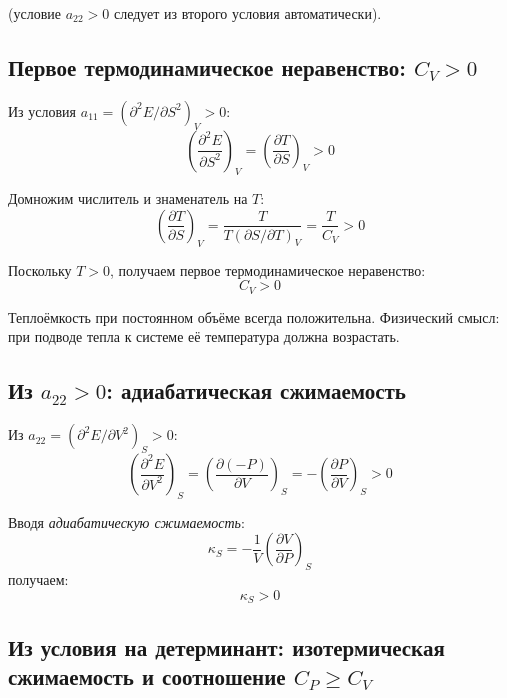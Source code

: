 \documentclass[../general/general]{subfiles}
\begin{document}
(условие $a_{22} > 0$ следует из второго условия автоматически).

\subsection{Первое термодинамическое неравенство: $C_V > 0$}

Из условия $a_{11} = \left(\partial^2 E/\partial S^2\right)_V > 0$:
\begin{equation}
    \left(\frac{\partial^2 E}{\partial S^2}\right)_{\!V} = \left(\frac{\partial T}{\partial S}\right)_{\!V} > 0
\end{equation}

Домножим числитель и знаменатель на $T$:
\begin{equation}
    \left(\frac{\partial T}{\partial S}\right)_{\!V} = \frac{T}{T\left(\partial S/\partial T\right)_V} = \frac{T}{C_V} > 0
\end{equation}

Поскольку $T > 0$, получаем первое термодинамическое неравенство:
\begin{equation}
    \boxed{C_V > 0}
    \label{eq:CV_pos}
\end{equation}

Теплоёмкость при постоянном объёме всегда положительна. Физический смысл: при подводе тепла к системе её температура должна возрастать.

\subsection{Из $a_{22} > 0$: адиабатическая сжимаемость}

Из $a_{22} = \left(\partial^2 E/\partial V^2\right)_S > 0$:
\begin{equation}
    \left(\frac{\partial^2 E}{\partial V^2}\right)_{\!S} = \left(\frac{\partial(-P)}{\partial V}\right)_{\!S} = -\left(\frac{\partial P}{\partial V}\right)_{\!S} > 0
\end{equation}

Вводя \emph{адиабатическую сжимаемость}:
\begin{equation}
    \kappa_S = -\frac{1}{V}\left(\frac{\partial V}{\partial P}\right)_{\!S}
\end{equation}
получаем:
\begin{equation}
    \boxed{\kappa_S > 0}
\end{equation}

\subsection{Из условия на детерминант: изотермическая сжимаемость и соотношение $C_P \geq C_V$}
\end{document}
